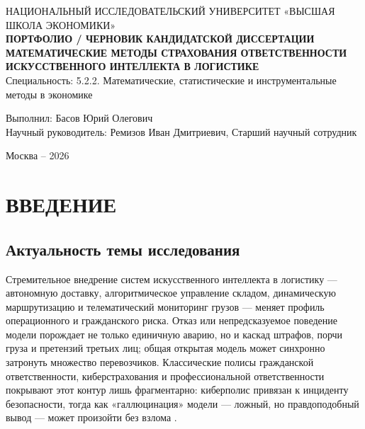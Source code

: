 \documentclass[a4paper,14pt]{extarticle}
\begin{document}
\begin{titlepage}
\begin{center}
\large
НАЦИОНАЛЬНЫЙ ИССЛЕДОВАТЕЛЬСКИЙ УНИВЕРСИТЕТ «ВЫСШАЯ ШКОЛА ЭКОНОМИКИ»\\
\vspace{3cm}
\textbf{ПОРТФОЛИО / ЧЕРНОВИК КАНДИДАТСКОЙ ДИССЕРТАЦИИ}\\
\vspace{2cm}
\Large
\textbf{МАТЕМАТИЧЕСКИЕ МЕТОДЫ СТРАХОВАНИЯ ОТВЕТСТВЕННОСТИ ИСКУССТВЕННОГО ИНТЕЛЛЕКТА В ЛОГИСТИКЕ}\\
\vspace{2cm}
\large
Специальность: 5.2.2. Математические, статистические и инструментальные методы в экономике
\end{center}
\vfill
\begin{flushright}
Выполнил: Басов Юрий Олегович\\
Научный руководитель: Ремизов Иван Дмитриевич, Старший научный сотрудник
\end{flushright}
\vspace{2cm}
\begin{center}
Москва -- 2026
\end{center}
\end{titlepage}

\tableofcontents
\newpage

\section*{ВВЕДЕНИЕ}

\subsection*{Актуальность темы исследования}

Стремительное внедрение систем искусственного интеллекта в логистику --- автономную доставку, алгоритмическое управление складом, динамическую маршрутизацию и телематический мониторинг грузов --- меняет профиль операционного и гражданского риска. Отказ или непредсказуемое поведение модели порождает не только единичную аварию, но и каскад штрафов, порчи груза и претензий третьих лиц; общая открытая модель может синхронно затронуть множество перевозчиков. Классические полисы гражданской ответственности, киберстрахования и профессиональной ответственности покрывают этот контур лишь фрагментарно: киберполис привязан к инциденту безопасности, тогда как «галлюцинация» модели --- ложный, но правдоподобный вывод --- может произойти без взлома \cite{zezina, cbr}.
\end{document}
